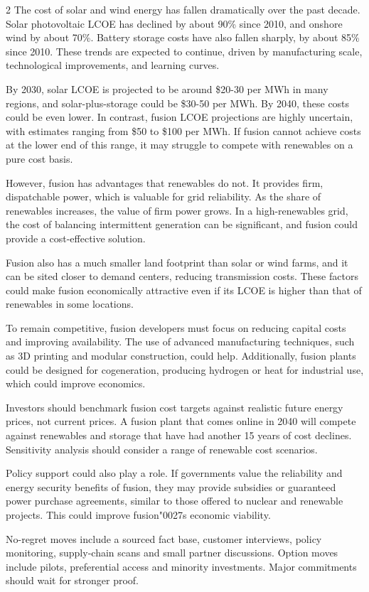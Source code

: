 \documentclass[10pt,a4paper]{article}
\newcommand{\BOApos}{{\BOQuoteFont\char"0027}}
\begin{document}
\begin{multicols}{2}
{\small The cost of solar and wind energy has fallen dramatically over the past decade. Solar photovoltaic LCOE has declined by about 90\% since 2010, and onshore wind by about 70\%. Battery storage costs have also fallen sharply, by about 85\% since 2010. These trends are expected to continue, driven by manufacturing scale, technological improvements, and learning curves.}\par
{\small By 2030, solar LCOE is projected to be around \$20-30 per MWh in many regions, and solar-plus-storage could be \$30-50 per MWh. By 2040, these costs could be even lower. In contrast, fusion LCOE projections are highly uncertain, with estimates ranging from \$50 to \$100 per MWh. If fusion cannot achieve costs at the lower end of this range, it may struggle to compete with renewables on a pure cost basis.}\par
{\small However, fusion has advantages that renewables do not. It provides firm, dispatchable power, which is valuable for grid reliability. As the share of renewables increases, the value of firm power grows. In a high-renewables grid, the cost of balancing intermittent generation can be significant, and fusion could provide a cost-effective solution.}\par
{\small Fusion also has a much smaller land footprint than solar or wind farms, and it can be sited closer to demand centers, reducing transmission costs. These factors could make fusion economically attractive even if its LCOE is higher than that of renewables in some locations.}\par
{\small To remain competitive, fusion developers must focus on reducing capital costs and improving availability. The use of advanced manufacturing techniques, such as 3D printing and modular construction, could help. Additionally, fusion plants could be designed for cogeneration, producing hydrogen or heat for industrial use, which could improve economics.}\par
{\small Investors should benchmark fusion cost targets against realistic future energy prices, not current prices. A fusion plant that comes online in 2040 will compete against renewables and storage that have had another 15 years of cost declines. Sensitivity analysis should consider a range of renewable cost scenarios.}\par
{\small Policy support could also play a role. If governments value the reliability and energy security benefits of fusion, they may provide subsidies or guaranteed power purchase agreements, similar to those offered to nuclear and renewable projects. This could improve fusion\BOApos{}s economic viability.}\par
{\small No-regret moves include a sourced fact base, customer interviews, policy monitoring, supply-chain scans and small partner discussions. Option moves include pilots, preferential access and minority investments. Major commitments should wait for stronger proof.}\par
\end{multicols}
\end{document}

